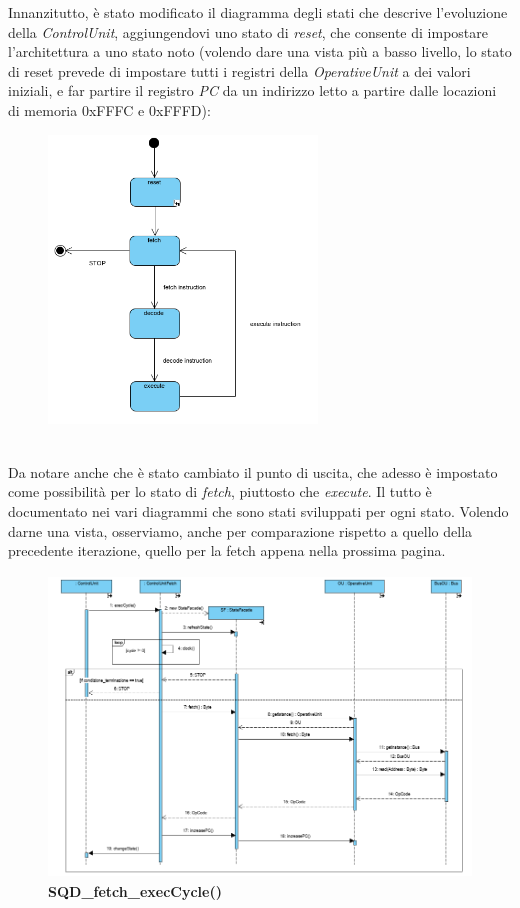 \documentclass[11pt]{article}
\begin{document}
Innanzitutto, è stato modificato il diagramma degli stati che descrive l'evoluzione della \emph{ControlUnit}, aggiungendovi uno stato di \emph{reset}, che consente di impostare l'architettura a uno stato noto (volendo dare una vista più a basso livello, lo stato di reset prevede di impostare tutti i registri della \emph{OperativeUnit} a dei valori iniziali, e far partire il registro \emph{PC} da un indirizzo letto a partire dalle locazioni di memoria 0xFFFC e 0xFFFD):
\begin{figure}[h]
\centering
\includegraphics[width=270px, height=290px]{SD_ControlUnit_1}
\end{figure}\\
Da notare anche che è stato cambiato il punto di uscita, che adesso è impostato come possibilità per lo stato di \emph{fetch}, piuttosto che \emph{execute}. Il tutto è documentato nei vari diagrammi che sono stati sviluppati per ogni stato. Volendo darne una vista, osserviamo, anche per comparazione rispetto a quello della precedente iterazione, quello per la fetch appena nella prossima pagina.
\begin{figure}[!h]
\hspace*{-1.2cm}
\centering
\includegraphics[width=425px, height=303px]{SQD_fetch_execCycle()_1.png}\\
\small\textbf{SQD\_fetch\_execCycle()}
\end{figure}\\
\end{document}
